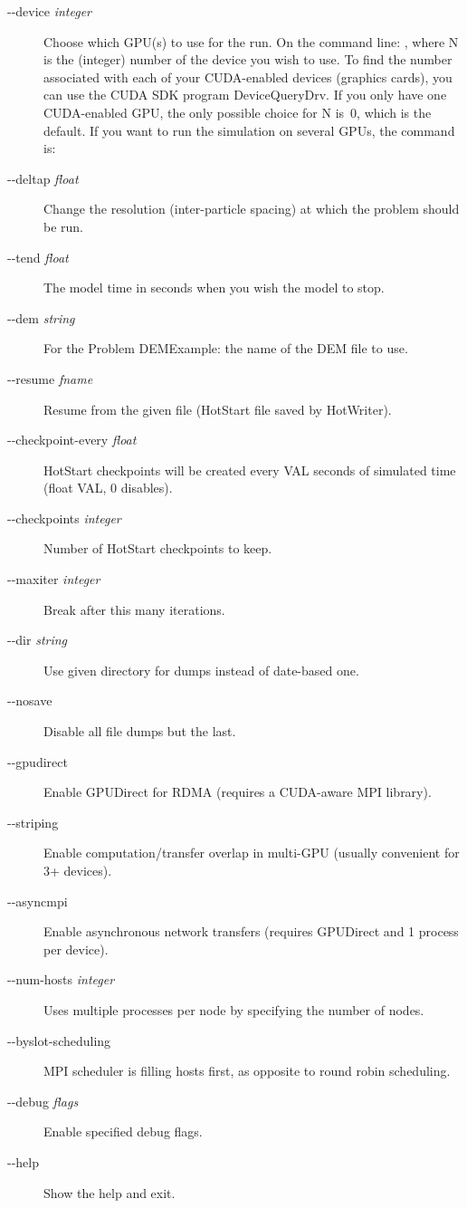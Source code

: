\documentclass{../GPUSPHtemplate}
\begin{document}
\begin{description}
\item [-{}-device \emph{integer}]
Choose which GPU(s) to use for the run.
On the command line: , where N is the
(integer) number of the device you wish to use. 
To find the number associated with each of your CUDA-enabled 
devices (graphics cards), you
can use the CUDA SDK program DeviceQueryDrv. If you only have one
CUDA-enabled GPU, the only possible choice for N is~0, which is the
default.
If you want to run the simulation on several GPUs, the command is:
\item [-{}-deltap \emph{float}]
Change the resolution (inter-particle spacing) at which the problem
should be run.
\item [-{}-tend \emph{float}]
The model time in seconds when you wish the model to stop.
\item [-{}-dem \emph{string}]
For the Problem DEMExample: the name of the DEM file to use.
\item [-{}-resume \emph{fname}]
Resume from the given file (HotStart file saved by HotWriter).
\item [-{}-checkpoint-every \emph{float}]
HotStart checkpoints will be created every VAL seconds of simulated time (float VAL, 0 disables).
\item [-{}-checkpoints \emph{integer}]
Number of HotStart checkpoints to keep.
\item [-{}-maxiter \emph{integer}]
Break after this many iterations.
\item [-{}-dir \emph{string}]
Use given directory for dumps instead of date-based one.
\item [-{}-nosave]
Disable all file dumps but the last.
\item [-{}-gpudirect]
Enable GPUDirect for RDMA (requires a CUDA-aware MPI library).
\item [-{}-striping]
Enable computation/transfer overlap in multi-GPU (usually convenient for 3+ devices).
\item [-{}-asyncmpi]
Enable asynchronous network transfers (requires GPUDirect and 1 process per device).
\item [-{}-num-hosts \emph{integer}]
Uses multiple processes per node by specifying the number of nodes.
\item [-{}-byslot-scheduling]
MPI scheduler is filling hosts first, as opposite to round robin scheduling.
\item [-{}-debug \emph{flags}]
Enable specified debug flags.
\item [-{}-help]
Show the help and exit.
\end{description}
\end{document}
